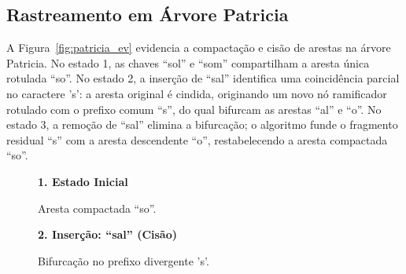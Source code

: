 \documentclass[11pt,a4paper]{article}
\begin{document}
\subsection{Rastreamento em Árvore Patricia}
A Figura~\ref{fig:patricia_ev} evidencia a compactação e cisão de arestas na árvore Patricia. No estado 1, as chaves ``sol'' e ``som'' compartilham a aresta única rotulada ``so''. No estado 2, a inserção de ``sal'' identifica uma coincidência parcial no caractere 's': a aresta original é cindida, originando um novo nó ramificador rotulado com o prefixo comum ``s'', do qual bifurcam as arestas ``al'' e ``o''. No estado 3, a remoção de ``sal'' elimina a bifurcação; o algoritmo funde o fragmento residual ``s'' com a aresta descendente ``o'', restabelecendo a aresta compactada ``so''.

\begin{figure}[htbp]
\centering
\begin{minipage}[t]{0.31\textwidth}
\centering\textbf{1. Estado Inicial}\par\smallskip
{}
\par\tiny Aresta compactada ``so''.
\end{minipage}\hfill
\begin{minipage}[t]{0.31\textwidth}
\centering\textbf{2. Inserção: ``sal'' (Cisão)}\par\smallskip
{}
\par\tiny Bifurcação no prefixo divergente 's'.
\end{minipage}\hfill

\end{figure}
\end{document}
